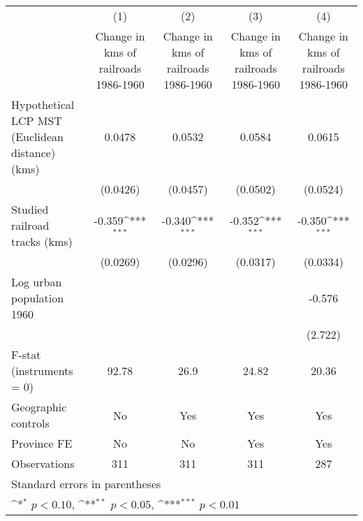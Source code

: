 {
\def\sym#1{\ifmmode^{#1}\else\(^{#1}\)\fi}
\begin{tabular}{l*{4}{c}}
\hline\hline
                &\multicolumn{1}{c}{(1)}&\multicolumn{1}{c}{(2)}&\multicolumn{1}{c}{(3)}&\multicolumn{1}{c}{(4)}\\
                &\multicolumn{1}{c}{Change in kms of railroads 1986-1960}&\multicolumn{1}{c}{Change in kms of railroads 1986-1960}&\multicolumn{1}{c}{Change in kms of railroads 1986-1960}&\multicolumn{1}{c}{Change in kms of railroads 1986-1960}\\
\hline
Hypothetical LCP MST (Euclidean distance)(kms)&   0.0478         &   0.0532         &   0.0584         &   0.0615         \\
                & (0.0426)         & (0.0457)         & (0.0502)         & (0.0524)         \\
[1em]
Studied railroad tracks (kms)&   -0.359\sym{***}&   -0.340\sym{***}&   -0.352\sym{***}&   -0.350\sym{***}\\
                & (0.0269)         & (0.0296)         & (0.0317)         & (0.0334)         \\
[1em]
Log urban population 1960&                  &                  &                  &   -0.576         \\
                &                  &                  &                  &  (2.722)         \\
\hline
F-stat (instruments = 0)&    92.78         &     26.9         &    24.82         &    20.36         \\
Geographic controls&       No         &      Yes         &      Yes         &      Yes         \\
Province FE     &       No         &       No         &      Yes         &      Yes         \\
Observations    &      311         &      311         &      311         &      287         \\
\hline\hline
\multicolumn{5}{l}{\footnotesize Standard errors in parentheses}\\
\multicolumn{5}{l}{\footnotesize \sym{*} \(p<0.10\), \sym{**} \(p<0.05\), \sym{***} \(p<0.01\)}\\
\end{tabular}
}
